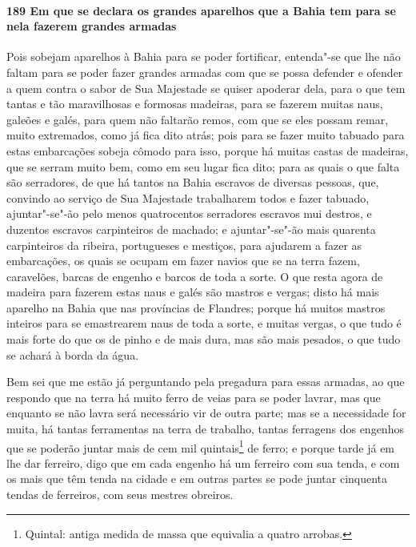 \begin{linenumbers}
\paragraph{189 Em que se declara os grandes aparelhos que a Bahia tem para se nela fazerem
grandes armadas}\quad
Pois sobejam aparelhos à Bahia para se poder fortificar, entenda"-se que lhe não faltam
para se poder fazer grandes armadas com que se possa defender e ofender a quem contra o
sabor de Sua Majestade se quiser apoderar dela, para o que tem tantas e tão maravilhosas e
formosas madeiras, para se fazerem muitas naus, galeões e galés, para quem não faltarão
remos, com que se eles possam remar, muito extremados, como já fica dito atrás; pois para
se fazer muito tabuado para estas embarcações sobeja cômodo para isso, porque há muitas
castas de madeiras, que se serram muito bem, como em seu lugar fica dito; para as quais o
que falta são serradores, de que há tantos na Bahia escravos de diversas pessoas, que,
convindo ao serviço de Sua Majestade trabalharem todos e fazer tabuado, ajuntar"-se"-ão pelo
menos quatrocentos serradores escravos mui destros, e duzentos escravos carpinteiros de
machado; e ajuntar"-se"-ão mais quarenta carpinteiros da ribeira, portugueses e mestiços,
para ajudarem a fazer as embarcações, os quais se ocupam em fazer navios que se na terra
fazem, caravelões, barcas de engenho e barcos de toda a sorte. O que resta agora de
madeira para fazerem estas naus e galés são mastros e vergas; disto há mais aparelho na
Bahia que nas províncias de Flandres; porque há muitos mastros inteiros para se
emastrearem naus de toda a sorte, e muitas vergas, o que tudo é mais forte do que os de
pinho e de mais dura, mas são mais pesados, o que tudo se achará à borda da água.

Bem sei que me estão já perguntando pela pregadura para essas armadas, ao que respondo que
na terra há muito ferro de veias para se poder lavrar, mas que enquanto se não lavra será
necessário vir de outra parte; mas se a necessidade for muita, há tantas ferramentas na
terra de trabalho, tantas ferragens dos engenhos que se poderão juntar mais de cem mil
quintais\footnote{ Quintal: antiga medida de massa que equivalia a quatro arrobas.} de ferro; e
porque tarde já em lhe dar ferreiro, digo que em cada engenho há um ferreiro com sua
tenda, e com os mais que têm tenda na cidade e em outras partes se pode juntar cinquenta
tendas de ferreiros, com seus mestres obreiros.


\end{linenumbers}
